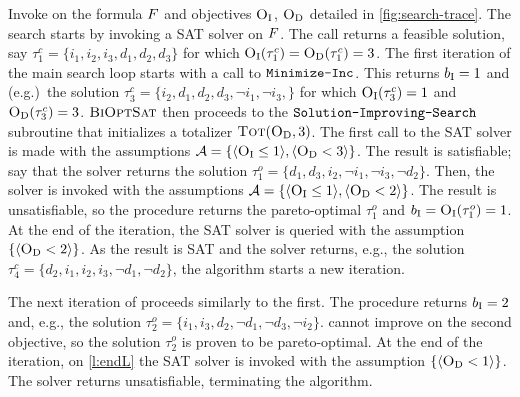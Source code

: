 \begin{example}\label{ex:main-iteration}
  Invoke \algname{} on the formula $F$ and objectives $\textsc{O}_{\text{I}}$, $\textsc{O}_{\text{D}}$ detailed in \cref{fig:search-trace}. 
  The search starts by invoking a SAT solver on $F$.
  The call returns a feasible solution, say $\tau^c_1 = \{i_1, i_2, i_3, d_1, d_2, d_3\}$ for which  $\textsc{O}_{\text{I}}(\tau^c_1) = \textsc{O}_{\text{D}}(\tau^c_1) = 3$. 
  The first iteration of the main search loop starts with a call to $\texttt{Minimize-\allowbreak{}Inc}$.
  This returns $b_{\text{I}} = 1$ and (e.g.)\ the solution $\tau^c_3 = \{ i_2, d_1, d_2, d_3, \lnot i_1, \lnot i_3,\}$ for which $\textsc{O}_{\text{I}}(\tau^c_3) = 1$ and $\textsc{O}_{\text{D}}(\tau^c_3) = 3$. $\textsc{BiOptSat}$ then proceeds to the $\texttt{Solution-\allowbreak{}Improving-\allowbreak{}Search}$ subroutine that initializes a  totalizer $\textsc{Tot}(\textsc{O}_{\text{D}}, 3)$.
  The first call to the SAT solver is made with the assumptions $\mathcal{A} = \{ \langle \textsc{O}_{\text{I}} \leq 1 \rangle, \langle \textsc{O}_{\text{D}} < 3 \rangle \}$.
  The result is satisfiable;
  say that the solver returns the solution $\tau^o_1 = \{d_1, d_3, i_2, \lnot i_1, \lnot i_3, \lnot d_2\}$.
  Then, the solver is invoked with the assumptions $\mathcal{A} =  \{ \langle \textsc{O}_{\text{I}} \leq 1 \rangle, \langle \textsc{O}_{\text{D}} < 2 \rangle \}$.
  The result is unsatisfiable, so the procedure returns the pareto-optimal $\tau^o_1$ and $b_{\text{I}} = \textsc{O}_{\text{I}}(\tau^o_1) = 1$.
  At the end of the iteration, the SAT solver is queried with the assumption $\{ \langle \textsc{O}_{\text{D}} < 2 \rangle \}$.
  As the result is SAT and the solver returns, e.g., the solution $\tau^c_4 = \{ d_2, i_1, i_2, i_3, \lnot d_1, \lnot d_2 \}$,
  the algorithm starts a new iteration.

  The next iteration of \algname{} proceeds similarly to the first.
  The procedure \Min{} returns $b_{\text{I}} = 2$ and, e.g., the solution $\tau^o_2 = \{ i_1, i_3, d_2, \lnot d_1, \lnot d_3, \lnot i_2\}$.
  \Simpr{} cannot improve on the second objective, so the solution $\tau^o_2$ is proven to be pareto-optimal.
  At the end of the iteration, on \cref{l:endL} the SAT solver is invoked with the assumption $\{\langle \textsc{O}_{\text{D}} < 1 \rangle\}$.
  The solver returns unsatisfiable, terminating the algorithm. 
\end{example}


